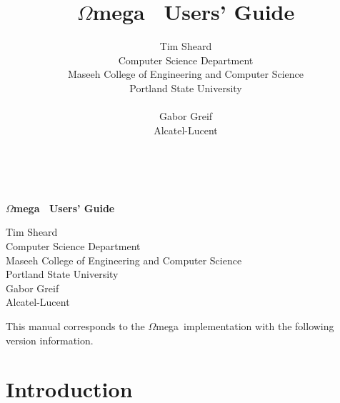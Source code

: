 \documentclass[11pt,twoside]{article}
\newcommand{\om}{$\Omega$mega}
\begin{document}
\pagestyle{empty}
~
\begin{center}
{\sf
\vspace{0.5cm}
{\bf {\Large \om~ Users' Guide}}\\
\vspace{0.5cm}


\vspace{0.5cm}
{\large Tim Sheard}\\
Computer Science Department\\
Maseeh College of Engineering and Computer Science\\
Portland State University\\

\vspace{0.5cm}
{\large Gabor Greif}\\
Alcatel-Lucent\\
}
\end{center}

\tableofcontents

\newpage
This manual corresponds to the \om\ implementation with the
following version information.

\begin{center}

\end{center}




\newpage
\pagestyle{plain}

\setcounter{page}{1}


\title{\om~ Users' Guide}
\author{
Tim Sheard\\
Computer Science Department\\
Maseeh College of Engineering and Computer Science\\
Portland State University\\
\\
Gabor Greif\\
Alcatel-Lucent\\
}


\maketitle

\section{Introduction}\label{intro}
\end{document}
